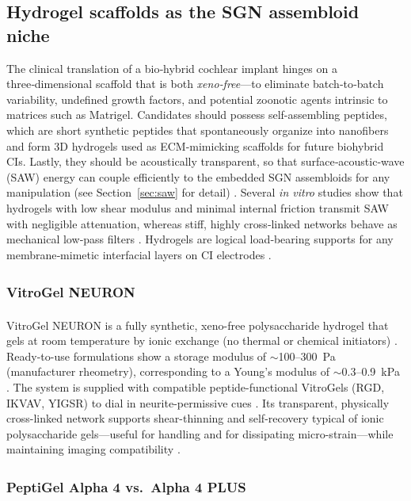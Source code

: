 \documentclass[referee,pdflatex, sn-vancouver-num]{sn-jnl}%
\theoremstyle{thmstyleone}%
\theoremstyle{thmstyletwo}%
\theoremstyle{thmstylethree}%
\begin{document}
\subsection{Hydrogel scaffolds as the SGN assembloid niche}
The clinical translation of a bio‑hybrid cochlear implant hinges on a three‑dimensional scaffold that is both \emph{xeno‑free}—to eliminate batch‑to‑batch variability, undefined growth factors, and potential zoonotic agents intrinsic to matrices such as Matrigel. Candidates should possess self-assembling peptides, which are short synthetic peptides that spontaneously organize into nanofibers and form 3D hydrogels used as ECM-mimicking scaffolds for future biohybrid CIs. Lastly, they should be acoustically transparent, so that surface‑acoustic‑wave (SAW) energy can couple efficiently to the embedded SGN assembloids for any manipulation (see Section~\ref{sec:saw} for detail) \cite{Aisenbrey2020,Kozlowski2021,Sebastian2023}. 
Several \textit{in vitro} studies show that hydrogels with low shear modulus and minimal internal friction transmit SAW with negligible attenuation, whereas stiff, highly cross‑linked networks behave as mechanical low‑pass filters \cite{Sebastian2023,Liao2008,Haruna2020}. Hydrogels are logical load‑bearing supports for any membrane‑mimetic interfacial layers on CI electrodes \cite{Carnicer-Lombarte:2025aa}.

\subsubsection{VitroGel\texorpdfstring{\textsuperscript{\textregistered}}{ (R)} NEURON} 
VitroGel\textsuperscript{\textregistered} NEURON is a fully synthetic, xeno-free polysaccharide hydrogel that gels at room temperature by ionic exchange (no thermal or chemical initiators) \cite{TheWell_GelationWorks,TheWell_NeuronPage}. Ready-to-use formulations show a storage modulus of \(\sim\)100–300~Pa (manufacturer rheometry), corresponding to a Young’s modulus of \(\sim\)0.3–0.9~kPa \citep{TheWell_ReadyToUseModulus}. The system is supplied with compatible peptide-functional VitroGels (RGD, IKVAV, YIGSR) to dial in neurite-permissive cues \citep{TheWell_RGD,TheWell_IKVAV,TheWell_YIGSR}. Its transparent, physically cross-linked network supports shear-thinning and self-recovery typical of ionic polysaccharide gels—useful for handling and for dissipating micro-strain—while maintaining imaging compatibility \citep{TheWell_NeuronPage,Karvinen2022SelfHealing,Nishimura2023SelfHealing}.

\subsubsection{PeptiGel\texorpdfstring{\textsuperscript{\textregistered}}{ (R)} Alpha 4 vs.\ Alpha 4 PLUS}
\end{document}
